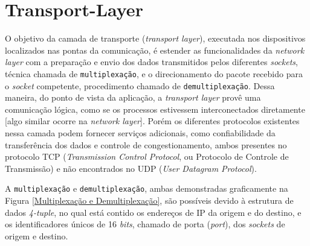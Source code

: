 




\hypertarget{transport-layer}{%
\chapter{Transport-Layer} \label{transport-layer}}

O objetivo da camada de transporte (\emph{transport layer}), executada
nos dispositivos localizados nas pontas da comunicação, é estender as
funcionalidades da \emph{network layer} com a preparação e envio dos
dados transmitidos pelos diferentes \emph{sockets}, técnica chamada de
\texttt{multiplexação}, e o direcionamento do pacote recebido para o
\emph{socket} competente, procedimento chamado de
\texttt{demultiplexação}. Dessa maneira, do ponto de vista da aplicação,
a \emph{transport layer} provê uma comunicação lógica, como se os
processos estivessem interconectados diretamente {[}algo similar ocorre
na \emph{network layer}{]}. Porém os diferentes protocolos existentes
nessa camada podem fornecer serviços adicionais, como confiabilidade da
transferência dos dados e controle de congestionamento, ambos presentes
no protocolo TCP (\emph{Transmission Control Protocol}, ou Protocolo de
Controle de Transmissão) e não encontrados no UDP (\emph{User Datagram
Protocol}).

A \texttt{multiplexação} e \texttt{demultiplexação}, ambas demonstradas
graficamente na Figura \ref{Multiplexação e Demultiplexação}, são possíveis devido à estrutura de dados
\emph{4-tuple}, no qual está contido os endereços de IP da origem e do
destino, e os identificadores únicos de 16 \emph{bits}, chamado de porta
(\emph{port}), dos \emph{sockets} de origem e destino.


